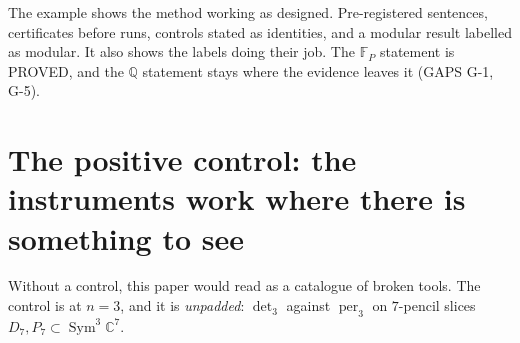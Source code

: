 \documentclass[11pt]{amsart}
\theoremstyle{plain}
\theoremstyle{definition}
\theoremstyle{remark}
\DeclareMathOperator{\Sym}{Sym}
\DeclareMathOperator{\per}{per}
\newcommand{\bC}{\mathbb{C}}
\newcommand{\bQ}{\mathbb{Q}}
\newcommand{\bF}{\mathbb{F}}
\begin{document}
The example shows the method working as designed. Pre-registered sentences, certificates
before runs, controls stated as identities, and a modular result labelled as modular. It also
shows the labels doing their job. The $\bF_P$ statement is PROVED, and the $\bQ$ statement stays
where the evidence leaves it (GAPS G-1, G-5).

\section{The positive control: the instruments work where there is something to see}\label{sec:control}

Without a control, this paper would read as a catalogue of broken tools. The control is at
$n=3$, and it is \emph{unpadded}: $\det_3$ against $\per_3$ on $7$-pencil slices
$D_7,P_7\subset\Sym^3\bC^7$.
\end{document}
